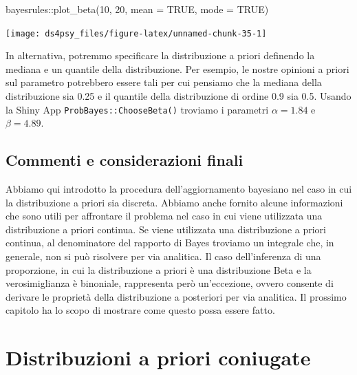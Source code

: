 \documentclass[
  11pt,
]{krantz}
\makeatletter
\newenvironment{Shaded}{\begin{snugshade}}{\end{snugshade}}
\newcommand{\AttributeTok}[1]{\textcolor[rgb]{0.61,0.61,0.61}{#1}}
\newcommand{\ConstantTok}[1]{\textcolor[rgb]{0,0,0}{#1}}
\newcommand{\DecValTok}[1]{\textcolor[rgb]{0.06,0.06,0.06}{#1}}
\newcommand{\FunctionTok}[1]{\textcolor[rgb]{0,0,0}{#1}}
\newcommand{\NormalTok}[1]{#1}
\newcommand{\SpecialCharTok}[1]{\textcolor[rgb]{0,0,0}{#1}}
\newenvironment{kframe}{%
\medskip{}
\setlength{\fboxsep}{.8em}
 \def\at@end@of@kframe{}%
 \ifinner\ifhmode%
  \def\at@end@of@kframe{\end{minipage}}%
  \begin{minipage}{\columnwidth}%
 \fi\fi%
 \def\FrameCommand##1{\hskip\@totalleftmargin \hskip-\fboxsep
 \colorbox{shadecolor}{##1}\hskip-\fboxsep
     \hskip-\linewidth \hskip-\@totalleftmargin \hskip\columnwidth}%
 \MakeFramed {\advance\hsize-\width
   \@totalleftmargin\z@ \linewidth\hsize
   \@setminipage}}%
 {\par\unskip\endMakeFramed%
 \at@end@of@kframe}
\renewenvironment{Shaded}{\begin{kframe}}{\end{kframe}}
\theoremstyle{definition}
\theoremstyle{definition}
\theoremstyle{definition}
\theoremstyle{definition}
\theoremstyle{remark}
\makeatother
\begin{document}
\begin{Shaded}
\begin{Highlighting}[]
\NormalTok{bayesrules}\SpecialCharTok{::}\FunctionTok{plot\_beta}\NormalTok{(}\DecValTok{10}\NormalTok{, }\DecValTok{20}\NormalTok{, }\AttributeTok{mean =} \ConstantTok{TRUE}\NormalTok{, }\AttributeTok{mode =} \ConstantTok{TRUE}\NormalTok{)}
\end{Highlighting}
\end{Shaded}

\begin{center}\texttt{[image: ds4psy\_files/figure-latex/unnamed-chunk-35-1]} \end{center}

In alternativa, potremmo specificare la distribuzione a priori definendo la mediana e un quantile della distribuzione. Per esempio, le nostre opinioni a priori sul parametro potrebbero essere tali per cui pensiamo che la mediana della distribuzione sia 0.25 e il quantile della distribuzione di ordine 0.9 sia 0.5. Usando la Shiny App \texttt{ProbBayes::ChooseBeta()} troviamo i parametri \(\alpha = 1.84\) e \(\beta = 4.89\).

\hypertarget{commenti-e-considerazioni-finali-1}{%
\section*{Commenti e considerazioni finali}\label{commenti-e-considerazioni-finali-1}}


Abbiamo qui introdotto la procedura dell'aggiornamento bayesiano nel caso in cui la distribuzione a priori sia discreta. Abbiamo anche fornito alcune informazioni che sono utili per affrontare il problema nel caso in cui viene utilizzata una distribuzione a priori continua. Se viene utilizzata una distribuzione a priori continua, al denominatore del rapporto di Bayes troviamo un integrale che, in generale, non si può risolvere per via analitica. Il caso dell'inferenza di una proporzione, in cui la distribuzione a priori è una distribuzione Beta e la verosimiglianza è binoniale, rappresenta però un'eccezione, ovvero consente di derivare le proprietà della distribuzione a posteriori per via analitica. Il prossimo capitolo ha lo scopo di mostrare come questo possa essere fatto.

\hypertarget{chapter-distr-coniugate}{%
\chapter{Distribuzioni a priori coniugate}\label{chapter-distr-coniugate}}
\end{document}
